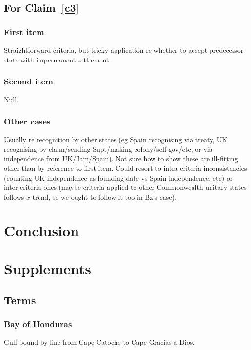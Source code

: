 \documentclass{amsart}
\theoremstyle{definition}%
\theoremstyle{definition}%
\begin{document}
\subsection{For Claim~\ref{c3}}
\subsubsection{First item} Straightforward criteria, but tricky application re whether to accept predecessor state with impermanent settlement.
\subsubsection{Second item} Null.
\subsubsection{Other cases} Usually re recognition by other states (eg Spain recognising via treaty, UK recognising by claim/sending Supt/making colony/self-gov/etc, or via independence from UK/Jam/Spain). Not sure how to show these are ill-fitting other than by reference to first item. Could resort to intra-criteria inconsistencies (counting UK-independence as founding date vs Spain-independence, etc) or inter-criteria ones (maybe criteria applied to other Commonwealth unitary states follows \(x\) trend, so we ought to follow it too in Bz's case).
%
%
%
%
\section{Conclusion}
\label{s:concl}
\lipsum[1][1-6]
%
%
%
% 
\begin{bibdiv}
\begin{biblist}
%
%
\end{biblist}
\end{bibdiv}
%
%
%
%
\newpage%
\section*{Supplements}
\label{s:supp}
\lipsum[1][1-6]
%
%
%
%
\subsection{Terms}%
\label{ss:terms}
\subsubsection{Bay of Honduras} Gulf bound by line from Cape Catoche to Cape Gracias a Dios.
\end{document}
